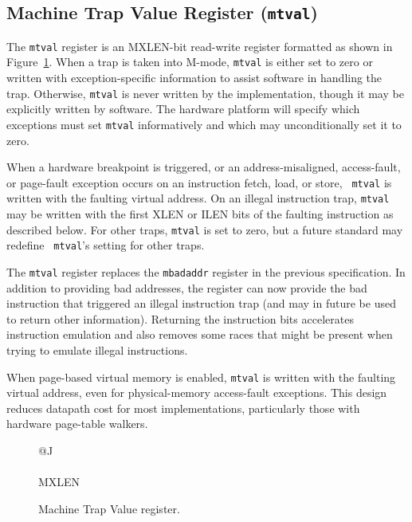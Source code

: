 \FloatBarrier
\subsection{Machine Trap Value Register ({\tt mtval})}

The {\tt mtval} register is an MXLEN-bit read-write register formatted as shown
in Figure~\ref{mtvalreg}.  When a trap is taken into M-mode, {\tt mtval} is
either set to zero or written with exception-specific information to assist
software in handling the trap.  Otherwise, {\tt mtval} is never written by the
implementation, though it may be explicitly written by software.  The hardware
platform will specify which exceptions must set {\tt mtval} informatively and
which may unconditionally set it to zero.

When a hardware breakpoint is triggered, or an
address-misaligned, access-fault, or page-fault exception occurs
on an instruction fetch, load, or store, {\tt
  mtval} is written with the faulting virtual address.  On an illegal
instruction trap, {\tt mtval} may be written with the first XLEN or ILEN
bits of the faulting instruction as described below.  For other traps,
{\tt mtval} is set to zero, but a future standard may redefine {\tt
  mtval}'s setting for other traps.

\begin{commentary}
  The {\tt mtval} register replaces the {\tt mbadaddr} register in
  the previous specification.  In addition to providing bad addresses,
  the register can now provide the bad instruction that triggered an
  illegal instruction trap (and may in future be used to return other
  information).  Returning the instruction bits accelerates instruction emulation and also
  removes some races that might be present when trying to emulate
  illegal instructions.
\end{commentary}
\begin{commentary}
  When page-based virtual memory is enabled, {\tt mtval} is written with
  the faulting virtual address, even for physical-memory access-fault exceptions.
  This design reduces datapath cost for most implementations, particularly
  those with hardware page-table walkers.
\end{commentary}

\begin{figure}[h!]
{\footnotesize
\begin{center}
\begin{tabular}{@{}J}
 \\
\hline
{} \\
\hline
MXLEN \\
\end{tabular}
\end{center}
}
\vspace{-0.1in}
\caption{Machine Trap Value register.}
\label{mtvalreg}
\end{figure}

